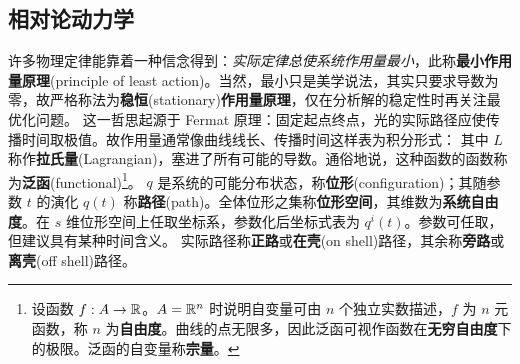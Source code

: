 \subsection{相对论动力学}

许多物理定律能靠着一种信念得到：\textit{实际定律总使系统作用量最小}，此称\textbf{最小作用量原理}(principle of least action)。当然，最小只是美学说法，其实只要求导数为零，故严格称法为\textbf{稳恒}(stationary)\textbf{作用量原理}，仅在分析解的稳定性时再关注最优化问题。
这一哲思起源于 Fermat 原理：固定起点终点，光的实际路径应使传播时间取极值。故作用量通常像曲线线长、传播时间这样表为积分形式：
其中 $L$ 称作\textbf{拉氏量}(Lagrangian)，塞进了所有可能的导数。通俗地说，这种函数的函数称为\textbf{泛函}(functional)\footnote{设函数 $f:A\to\mathbb{R}$。$A=\mathbb{R}^n$ 时说明自变量可由 $n$ 个独立实数描述，$f$ 为 $n$ 元函数，称 $n$ 为\textbf{自由度}。曲线的点无限多，因此泛函可视作函数在\textbf{无穷自由度}下的极限。泛函的自变量称\textbf{宗量}。}。
$q$ 是系统的可能分布状态，称\textbf{位形}(configuration)；其随参数 $t$ 的演化 $q(t)$ 称\textbf{路径}(path)。全体位形之集称\textbf{位形空间}，其维数为\textbf{系统自由度}。在 $s$ 维位形空间上任取坐标系，参数化后坐标式表为 $q^i(t)$。参数可任取，但建议具有某种时间含义。
实际路径称\textbf{正路}或\textbf{在壳}(on shell)路径，其余称\textbf{旁路}或\textbf{离壳}(off shell)路径。


